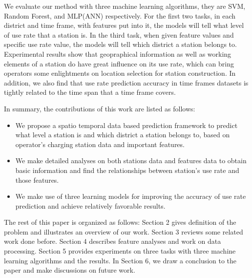 We evaluate our method with three machine learning algorithms, they are SVM, Random Forest, and MLP(ANN) respectively. For the first two tasks, in each district and time frame, with features put into it, the models will tell what level of use rate that a station is. In the third task, when given feature values and specific use rate value, the models will tell which district a station belongs to. Experimental results show that geopraphical information as well as working elements of a station do have great influence on its use rate, which can bring operators some enlightments on location selection for station construction. In addition, we also find that use rate prediction accuracy in time frames datasets is tightly related to the time span that a time frame covers.

In summary, the contributions of this work are listed as follows:
\begin{itemize}
	\item We propose a spatio temporal data based prediction framework to predict what level a station is and which district a station belongs to, based on operator's charging station data and important features.
	\item We make detailed analyses on both stations data and features data to obtain basic information and find the relationships between station's use rate and those features.
	\item We make use of three learning models for improving the accuracy of use rate prediction and achieve relatively favorable results.
\end{itemize}

The rest of this paper is organized as follows: Section 2 gives definition of the problem and illustrates an overview of our work. Section 3 reviews some related work done before. Section 4 describes feature analyses and work on data processing. Section 5 provides experiments on three tasks with three machine learning algorithms and the results. In Section 6, we draw a conclusion to the paper and make discussions on future work.
